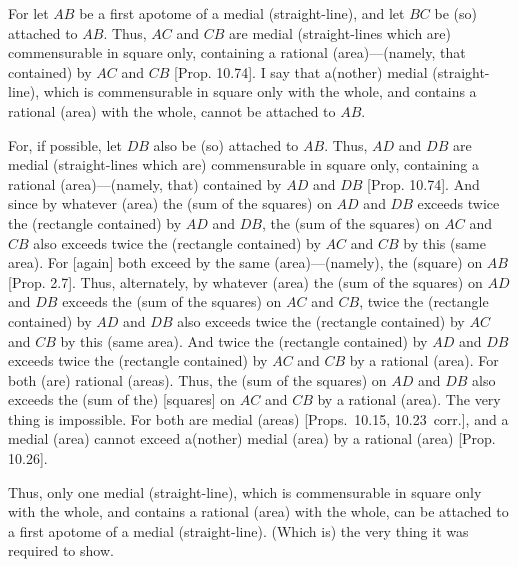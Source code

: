 \begin{Parallel}{}{}
{\epsfysize=0.26in 
\centerline{}

For let $AB$ be a first apotome of a medial (straight-line), and let $BC$ be (so) attached
to $AB$. Thus, $AC$ and $CB$ are medial (straight-lines which are)
commensurable in square only, containing a rational (area)---(namely, that
contained) by $AC$ and $CB$ [Prop. 10.74]. 
I say that a(nother) medial (straight-line), which is commensurable in square only with the whole, and
contains a rational (area) with the whole, cannot be attached to $AB$.

For, if possible, let $DB$ also be (so) attached to $AB$. Thus, $AD$ and
$DB$ are medial (straight-lines which are) commensurable in square only, containing a rational (area)---(namely, that)
contained by $AD$ and $DB$ [Prop. 10.74]. 
And since by whatever (area)
the (sum of the squares) on $AD$ and $DB$ exceeds twice the
(rectangle contained) by $AD$ and $DB$,  the (sum of the squares)
on $AC$ and $CB$ also exceeds twice the (rectangle contained) by $AC$ and
$CB$ by this (same area). For [again] both exceed by the same (area)---(namely), the (square)
on $AB$ [Prop. 2.7]. Thus, alternately, 
by whatever (area) the (sum of the squares) on $AD$ and 
$DB$ exceeds the (sum of the squares) on $AC$ and $CB$, 
 twice the (rectangle contained) by $AD$ and $DB$
also exceeds twice the (rectangle contained) by $AC$ and $CB$ by this (same area).
And twice the (rectangle contained) by $AD$ and $DB$ exceeds twice the (rectangle contained) by $AC$ and $CB$ by a rational (area). For both
(are) rational (areas). Thus,  the (sum of the squares) on $AD$ and $DB$ also
exceeds the (sum of the) [squares] on $AC$ and $CB$ by a
rational (area). The very thing is impossible. For both are
medial (areas) [Props.~10.15, 10.23~corr.],
and a medial (area) cannot exceed a(nother) medial (area) by a rational
(area) [Prop. 10.26].

Thus, only one medial (straight-line),
which is commensurable in square only with the whole, and
contains a rational (area) with the whole, can be attached
to a first apotome of a medial (straight-line). (Which is) the very thing it was required to
show.}
\end{Parallel}


\vspace{7pt}{\footnotesize\noindent$^\dag$ This proposition is equivalent to 
Prop.~10.43, with minus signs instead of
plus signs.}

